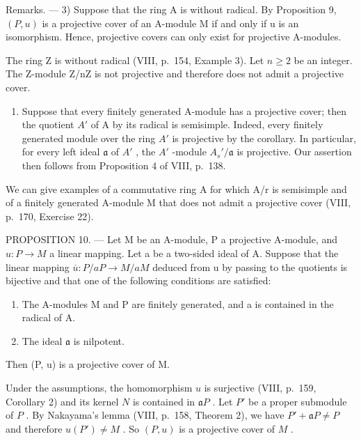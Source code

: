 Remarks. --- 3) Suppose that the ring A is without radical. By Proposition 9, \((P, u)\) is a projective cover of an A-module M if and only if u is an isomorphism. Hence, projective covers can only exist for projective A-modules.

The ring Z is without radical (VIII, p.~154, Example 3). Let \(n \geqslant 2\) be an integer. The Z-module Z/nZ is not projective and therefore does not admit a projective cover.

\begin{enumerate}
\def\labelenumi{\arabic{enumi})}
\setcounter{enumi}{3}
\tightlist
\item
  Suppose that every finitely generated A-module has a projective cover; then the quotient \(A'\) of A by its radical is semisimple. Indeed, every finitely generated module over the ring \(A'\) is projective by the corollary. In particular, for every left ideal \(\mathfrak{a}\) of \(A'\) , the \(A'\) -module \(A_s'/\mathfrak{a}\) is projective. Our assertion then follows from Proposition 4 of VIII, p.~138.
\end{enumerate}

We can give examples of a commutative ring A for which A/r is semisimple and of a finitely generated A-module M that does not admit a projective cover (VIII, p.~170, Exercise 22).

PROPOSITION 10. --- Let M be an A-module, P a projective A-module, and \(u : P \to M\) a linear mapping. Let a be a two-sided ideal of A. Suppose that the linear mapping \(\overline{u} : P / aP \to M / aM\) deduced from u by passing to the quotients is bijective and that one of the following conditions are satisfied:

\begin{enumerate}
\def\labelenumi{(\roman{enumi})}
\item
  The A-modules M and P are finitely generated, and a is contained in the radical of A.
\item
  The ideal \(\mathfrak{a}\) is nilpotent.
\end{enumerate}

Then (P, u) is a projective cover of M.

Under the assumptions, the homomorphism \(u\) is surjective (VIII, p.~159, Corollary 2) and its kernel \(N\) is contained in \(\mathfrak{a}P\) . Let \(P'\) be a proper submodule of \(P\) . By Nakayama's lemma (VIII, p.~158, Theorem 2), we have \(P' + \mathfrak{a}P \neq P\) and therefore \(u(P') \neq M\) . So \((P, u)\) is a projective cover of \(M\) .

